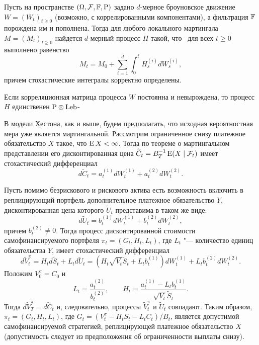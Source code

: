 \begin{proposition}
Пусть на пространстве $(\Omega, \F, \FF, \P)$ задано $d$-мерное броуновское движение $W=(W_t)_{t\ge0}$ (возможно, с коррелированными компонентами), а фильтрация $\FF$ порождена им и пополнена.
Тогда для любого локального мартингала $M = (M_t)_{t\ge 0}$ найдется $d$-мерный процесс $H$ такой, что \as\ для всех $t\ge 0$ выполнено равенство
\[
M_t = M_0 + \sum_{i=1}^d \int_0^t H_s^{(i)} d W_s^{(i)},
\]
причем стохастические интегралы корректно определены. 

Если корреляционная матрица процесса $W$ постоянна и невырождена, то процесс $H$ единственен $\P\otimes\mathrm{Leb}$-\as
\end{proposition}

В модели Хестона, как и выше, будем предполагать, что исходная вероятностная мера уже является мартингальной.
Рассмотрим ограниченное снизу платежное обязательство $X$ такое, что $\E X < \infty$.
Тогда по теореме о мартингальном представлении его дисконтированная цена $\tilde C_t = B_T^{-1}\E(X \mid \F_t)$ имеет стохастический дифференциал
\[
d \tilde C_t = a_t^{(1)} dW_t^{(1)} + a_t^{(2)} dW_t^{(2)}.
\]

Пусть помимо безрискового и рискового актива есть возможность включить в реплицирующий портфель дополнительное платежное обязательство $Y$, дисконтированная цена которого $\tilde U_t$ представима в таком же виде:
\[
d \tilde U_t = b_t^{(1)} dW_t^{(1)} + b_t^{(2)} dW_t^{(2)},
\]
причем $b_t^{(2)} \neq 0$. 
Тогда процесс дисконтированной стоимости самофинансируемого портфеля $\pi_t = (G_t, H_t, L_t)$, где $L_t$ "--- количество единиц обязательства $Y$, имеет стохастический дифференциал
\[
d \tilde V_t^\pi = H_t d\tilde S_t + L_t d \tilde U_t = (H_t\sqrt{V_t} \tilde S_t + L_tb_t^{(1)}) d W_t^{(1)} + L_tb_t^{(2)} dW_t^{(2)}.
\]
Положим $V_0^\pi = C_0$ и
\begin{equation}
\label{hdg:LH}
L_t = \frac{a_t^{(2)}}{b_t^{(2)}}, \qquad H_t = \frac{a_t^{(1)} - L_tb_t^{(1)}}{\sqrt{V_t} \tilde S_t}.
\end{equation}
Тогда $d\tilde V_T^\pi = d\tilde C_t$ и, следовательно, 
процессы $\tilde V_t^\pi$ и $\tilde U_t$ совпадают.
Таким образом, $\pi_t=(G_t,H_t,L_t)$, где $G_t = (V_t^\pi - H_t S_t - L_t C_t)/B_t$, является допустимой самофинансируемой стратегией, реплицирующей платежное обязательство $X$ (допустимость следует из предположения об ограниченности выплаты снизу).

